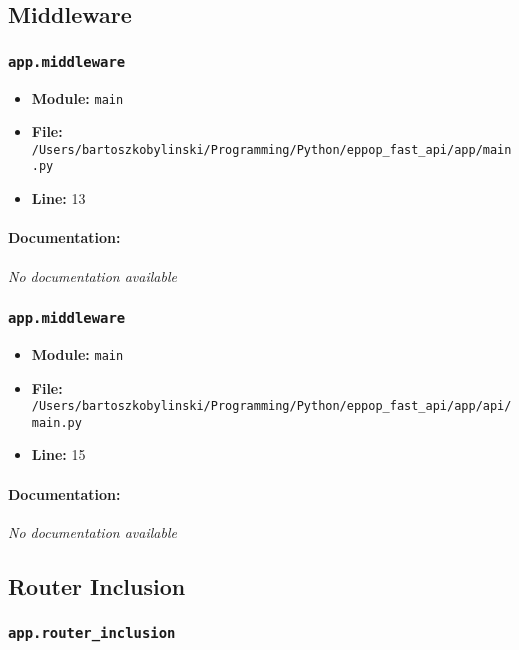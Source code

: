 \documentclass[11pt,a4paper]{article}
\begin{document}
\vspace{1em}
\subsection{Middleware}

\subsubsection{\texttt{app.middleware}}

\begin{itemize}
    \item \textbf{Module:} \texttt{main}
    \item \textbf{File:} \texttt{/Users/bartoszkobylinski/Programming/Python/eppop\_fast\_api/app/main.py}
    \item \textbf{Line:} 13
\end{itemize}

\paragraph{Documentation:} \textit{No documentation available}


\vspace{1em}
\subsubsection{\texttt{app.middleware}}

\begin{itemize}
    \item \textbf{Module:} \texttt{main}
    \item \textbf{File:} \texttt{/Users/bartoszkobylinski/Programming/Python/eppop\_fast\_api/app/api/main.py}
    \item \textbf{Line:} 15
\end{itemize}

\paragraph{Documentation:} \textit{No documentation available}


\vspace{1em}
\subsection{Router Inclusion}

\subsubsection{\texttt{app.router\_inclusion}}
\end{document}
